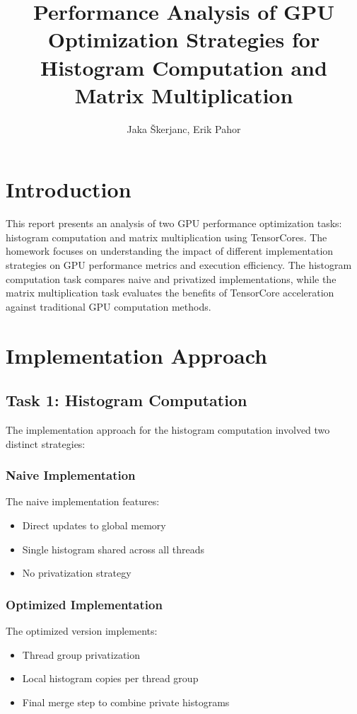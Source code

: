 \documentclass[9pt]{IEEEtran}
\title{\vspace{0ex}Performance Analysis of GPU Optimization Strategies for Histogram Computation and Matrix Multiplication}
\author{Jaka Škerjanc\vspace{-4.0ex}, Erik Pahor}
\begin{document}
\maketitle

\section{Introduction}
This report presents an analysis of two GPU performance optimization tasks: histogram computation and matrix multiplication using TensorCores. The homework focuses on understanding the impact of different implementation strategies on GPU performance metrics and execution efficiency. The histogram computation task compares naive and privatized implementations, while the matrix multiplication task evaluates the benefits of TensorCore acceleration against traditional GPU computation methods.

\section{Implementation Approach}

\subsection*{Task 1: Histogram Computation}
The implementation approach for the histogram computation involved two distinct strategies:

\subsubsection*{Naive Implementation}
The naive implementation features:
\begin{itemize}
    \item Direct updates to global memory
    \item Single histogram shared across all threads
    \item No privatization strategy
\end{itemize}

\subsubsection*{Optimized Implementation}
The optimized version implements:
\begin{itemize}
    \item Thread group privatization
    \item Local histogram copies per thread group
    \item Final merge step to combine private histograms
\end{itemize}
\end{document}
